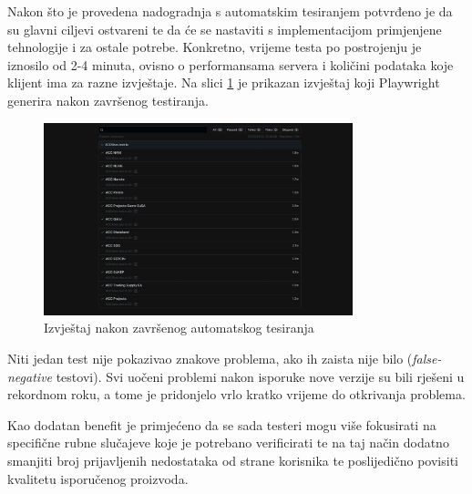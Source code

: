 Nakon što je provedena nadogradnja s automatskim tesiranjem potvrđeno je da su glavni ciljevi ostvareni te da će se nastaviti s implementacijom primjenjene tehnologije i za ostale potrebe.
Konkretno, vrijeme testa po postrojenju je iznosilo od 2-4 minuta, ovisno o performansama servera i količini podataka koje klijent ima za razne izvještaje.
Na slici \ref{img:fullTestPass} je prikazan izvještaj koji Playwright generira nakon završenog testiranja.
\begin{figure}[!h]\begin{center}
    \includegraphics[width=0.8\textwidth]{"img/fullTestPass"}
    \caption{Izvještaj nakon završenog automatskog tesiranja}\label{img:fullTestPass}
\end{center}\end{figure}
 
Niti jedan test nije pokazivao znakove problema, ako ih zaista nije bilo (\emph{false-negative} testovi).
Svi uočeni problemi nakon isporuke nove verzije su bili rješeni u rekordnom roku, a tome je pridonjelo vrlo kratko vrijeme do otkrivanja problema.

Kao dodatan benefit je primjećeno da se sada testeri mogu više fokusirati na specifične rubne slučajeve koje je potrebano verificirati te na taj način dodatno smanjiti broj prijavljenih nedostataka od strane korisnika te poslijedično povisiti kvalitetu isporučenog proizvoda.
